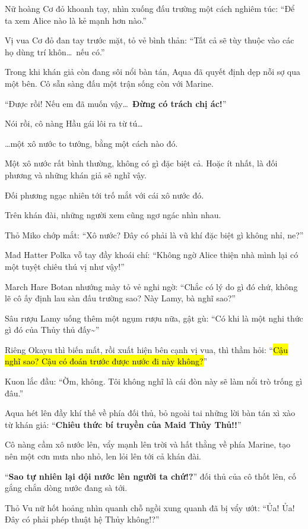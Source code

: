 \documentclass[../main.tex]{subfiles}
\begin{document}
Nữ hoàng Cơ đỏ khoanh tay, nhìn xuống đấu trường một cách nghiêm túc: ``Để ta xem Alice nào là kẻ mạnh hơn nào.''

Vị vua Cơ đỏ đan tay trước mặt, tỏ vẻ bình thản: ``Tất cả sẽ tùy thuộc vào các họ dùng trí khôn\dots\ nếu có.''

Trong khi khán giả còn đang sôi nổi bàn tán, Aqua đã quyết định dẹp nỗi sợ qua một bên. Cô sẫn sàng đấu một trận sống còn với Marine.

``Được rồi! Nếu em đã muốn vậy\dots\ \textbf{Đừng có trách chị ác!}''

Nói rồi, cô nàng Hầu gái lôi ra từ tú\dots

\dots một xô nước to tướng, bằng một cách nào đó.

Một xô nước rất bình thường, không có gì đặc biệt cả. Hoặc ít nhất, là đối phương và những khán giả sẽ nghĩ vậy.

Đối phương ngạc nhiên tới trố mắt với cái xô nước đó.

Trên khán đài, những người xem cũng ngơ ngác nhìn nhau.

Thỏ Miko chớp mắt: ``Xô nước? Đây có phải là vũ khí đặc biệt gì không nhỉ, ne?''

Mad Hatter Polka vỗ tay đầy khoái chí: ``Không ngờ Alice thiện nhà mình lại có một tuyệt chiêu thú vị như vậy!''

March Hare Botan nhướng mày tỏ vẻ nghi ngờ: ``Chắc có lý do gì đó chứ, không lẽ cô ấy định lau sàn đấu trường sao? Này Lamy, bà nghĩ sao?''

Sâu rượu Lamy uống thêm một ngụm rượu nữa, gật gù: ``Có khi là một nghi thức gì đó của Thủy thủ đấy\~{}''

Riêng Okayu thì biến mất, rồi xuất hiện bên cạnh vị vua, thì thầm hỏi: ``\hl{Cậu nghĩ sao? Cậu có đoán trước được nước đi này không?}''

Kuon lắc đầu: ``Ờm, không. Tôi không nghĩ là cái đòn này sẽ làm nổi trò trống gì đâu.''

Aqua hét lên đầy khí thế về phía đối thủ, bỏ ngoài tai những lời bàn tán xì xào từ khán giả: ``\textbf{Chiêu thức bí truyền của Maid Thủy Thủ!!}''

Cô nàng cầm xô nước lên, vẩy mạnh lên trời và hất thằng về phía Marine, tạo nên một cơn mưa nho nhỏ, len lỏi lên tới cả khán đài.

``\textbf{Sao tự nhiên lại dội nước lên người ta chứ!?}'' đối thủ của cô thốt lên, cố gắng chắn dòng nước đang sà tới.

Thỏ Vu nữ hốt hoảng nhìn quanh chỗ ngồi xung quanh đã bị vẩy ướt: ``Ủa! Ủa! Đây có phải phép thuật hệ Thủy không!?''
\end{document}
